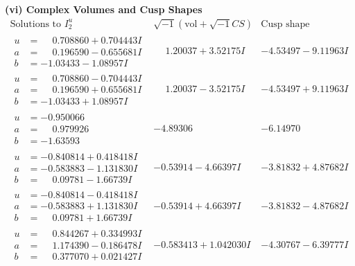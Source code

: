 \documentclass[1p]{elsarticle_modified}
\theoremstyle{definition}
\newcommand{\I}{\sqrt{-1}}
\begin{document}
\newpage\flushleft \textbf{(vi) Complex Volumes and Cusp Shapes}
$$\begin{array}{c|c|c}  
\text{Solutions to }I^u_{2}& \I (\text{vol} + \sqrt{-1}CS) & \text{Cusp shape}\\
 \hline 
\begin{aligned}
u &= \phantom{-}0.708860 + 0.704443 I \\
a &= \phantom{-}0.196590 - 0.655681 I \\
b &= -1.03433 - 1.08957 I\end{aligned}
 & \phantom{-}1.20037 + 3.52175 I & -4.53497 - 9.11963 I \\ \hline\begin{aligned}
u &= \phantom{-}0.708860 - 0.704443 I \\
a &= \phantom{-}0.196590 + 0.655681 I \\
b &= -1.03433 + 1.08957 I\end{aligned}
 & \phantom{-}1.20037 - 3.52175 I & -4.53497 + 9.11963 I \\ \hline\begin{aligned}
u &= -0.950066\phantom{ +0.000000I} \\
a &= \phantom{-}0.979926\phantom{ +0.000000I} \\
b &= -1.63593\phantom{ +0.000000I}\end{aligned}
 & -4.89306\phantom{ +0.000000I} & -6.14970\phantom{ +0.000000I} \\ \hline\begin{aligned}
u &= -0.840814 + 0.418418 I \\
a &= -0.583883 - 1.131830 I \\
b &= \phantom{-}0.09781 - 1.66739 I\end{aligned}
 & -0.53914 - 4.66397 I & -3.81832 + 4.87682 I \\ \hline\begin{aligned}
u &= -0.840814 - 0.418418 I \\
a &= -0.583883 + 1.131830 I \\
b &= \phantom{-}0.09781 + 1.66739 I\end{aligned}
 & -0.53914 + 4.66397 I & -3.81832 - 4.87682 I \\ \hline\begin{aligned}
u &= \phantom{-}0.844267 + 0.334993 I \\
a &= \phantom{-}1.174390 - 0.186478 I \\
b &= \phantom{-}0.377070 + 0.021427 I\end{aligned}
 & -0.583413 + 1.042030 I & -4.30767 - 6.39777 I \\ \hline\begin{aligned}

\end{aligned}
\end{array}$$
\end{document}
